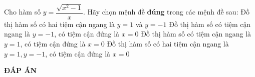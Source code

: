 \begin{ex}%
	Cho hàm số $y=\dfrac{\sqrt{x^2-1}}{x}$. Hãy chọn mệnh đề \textbf{đúng} trong các mệnh đề sau:
	\choice
	{\True Đồ thị hàm số có hai tiệm cận ngang là $y=1$ và $y=-1$}
	{Đồ thị hàm số có tiệm cận ngang là $y=-1$, có tiệm cận đứng là $x=0$}
	{Đồ thị hàm số có tiệm cận ngang là $y=1$, có tiệm cận đứng là $x=0$}
	{Đồ thị hàm số có hai tiệm cận ngang là $y=1,y=-1$, có tiệm cận đứng là $x=0$}
\end{ex}
\newpage
\begin{center}
	\textbf{ĐÁP ÁN}
\end{center}
\begin{multicols}{10}
	 
\end{multicols}
